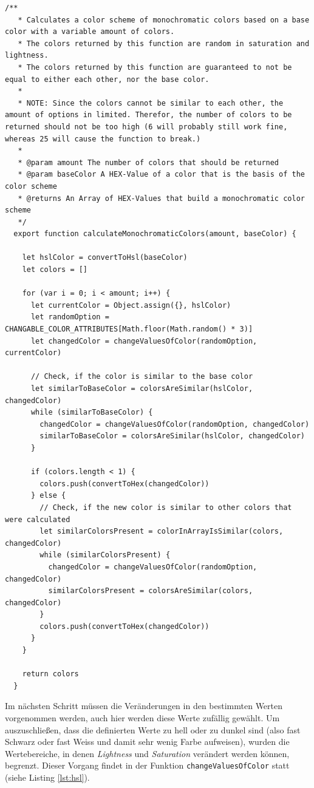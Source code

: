 \begin{lstlisting}[caption=Berechnung eines Monochromatischen Farbschemas, label=lst:mono]
  /**
   * Calculates a color scheme of monochromatic colors based on a base color with a variable amount of colors.
   * The colors returned by this function are random in saturation and lightness.
   * The colors returned by this function are guaranteed to not be equal to either each other, nor the base color.
   *
   * NOTE: Since the colors cannot be similar to each other, the amount of options in limited. Therefor, the number of colors to be returned should not be too high (6 will probably still work fine, whereas 25 will cause the function to break.)
   *
   * @param amount The number of colors that should be returned
   * @param baseColor A HEX-Value of a color that is the basis of the color scheme
   * @returns An Array of HEX-Values that build a monochromatic color scheme
   */
  export function calculateMonochromaticColors(amount, baseColor) {

    let hslColor = convertToHsl(baseColor)
    let colors = []

    for (var i = 0; i < amount; i++) {
      let currentColor = Object.assign({}, hslColor)
      let randomOption = CHANGABLE_COLOR_ATTRIBUTES[Math.floor(Math.random() * 3)]
      let changedColor = changeValuesOfColor(randomOption, currentColor)

      // Check, if the color is similar to the base color
      let similarToBaseColor = colorsAreSimilar(hslColor, changedColor)
      while (similarToBaseColor) {
        changedColor = changeValuesOfColor(randomOption, changedColor)
        similarToBaseColor = colorsAreSimilar(hslColor, changedColor)
      }

      if (colors.length < 1) {
        colors.push(convertToHex(changedColor))
      } else {
        // Check, if the new color is similar to other colors that were calculated
        let similarColorsPresent = colorInArrayIsSimilar(colors, changedColor)
        while (similarColorsPresent) {
          changedColor = changeValuesOfColor(randomOption, changedColor)
          similarColorsPresent = colorsAreSimilar(colors, changedColor)
        }
        colors.push(convertToHex(changedColor))
      }
    }

    return colors
  }
\end{lstlisting}

Im nächsten Schritt müssen die Veränderungen in den bestimmten Werten vorgenommen werden, auch hier werden diese Werte zufällig gewählt. Um auszuschließen, dass die definierten Werte zu hell oder zu dunkel sind (also fast Schwarz oder fast Weiss und damit sehr wenig Farbe aufweisen), wurden die Wertebereiche, in denen \textit{Lightness} und \textit{Saturation} verändert werden können, begrenzt. Dieser Vorgang findet in der Funktion \verb|changeValuesOfColor| statt (siehe Listing \ref{lst:hsl}).


